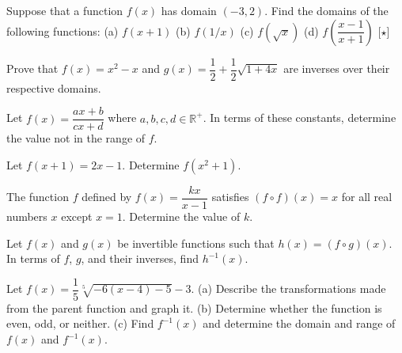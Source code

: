 \documentclass[lang=en,11pt]{elegantbook}
\begin{document}
\begin{challengeset}

\item Suppose that a function $f(x)$ has domain $(-3,2)$.  Find the domains of the following functions: \newline 
(a) $f(x+1)$ \hspace{15mm} (b) $f(1/x)$ \hspace{15mm} (c) $f(\sqrt{x})$ \hspace{15mm} (d) $f\left(\dfrac{x-1}{x+1}\right)$ [$\star$] \vspace{2mm}

\item Prove that $f(x)=x^2-x$ and $g(x)=\dfrac{1}{2}+\dfrac{1}{2}\sqrt{1+4x}$ are inverses over their respective domains.  \vspace{2mm}

\item Let $f(x)=\dfrac{ax+b}{cx+d}$ where $a,b,c,d\in\mathbb{R}^+$.  In terms of these constants, determine the value not in the range of $f$.  \vspace{2mm}

\item Let $f(x+1)=2x-1$.  Determine $f\left(x^2+1\right)$.  \vspace{2mm}

\item The function $f$ defined by $f(x)=\dfrac{kx}{x-1}$ satisfies $(f\circ f)(x)=x$ for all real numbers $x$ except $x=1$.  Determine the value of $k$.  \vspace{2mm}

\item Let $f(x)$ and $g(x)$ be invertible functions such that $h(x)=(f\circ g)(x)$.  In terms of $f$, $g$, and their inverses, find $h^{-1}(x)$.  \vspace{2mm}

\item Let $f(x)=\dfrac{1}{5}\sqrt[5]{-6(x-4)-5}-3$.  \newline 
(a) Describe the transformations made from the parent function and graph it.  \newline 
(b) Determine whether the function is even, odd, or neither.  \newline
(c) Find $f^{-1}(x)$ and determine the domain and range of $f(x)$ and $f^{-1}(x)$.
\end{challengeset}


\end{document}
